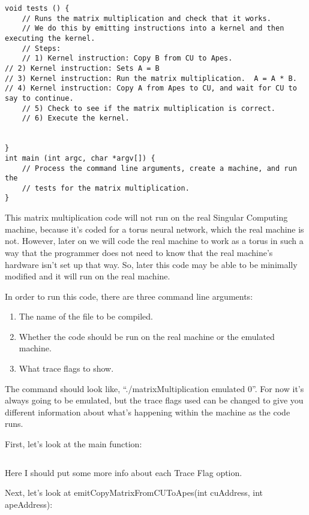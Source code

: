 \documentclass[10pt]{article}
\begin{document}
\begin{verbatim}
void tests () {
    // Runs the matrix multiplication and check that it works.
    // We do this by emitting instructions into a kernel and then executing the kernel.
    // Steps:
    // 1) Kernel instruction: Copy B from CU to Apes.
// 2) Kernel instruction: Sets A = B
// 3) Kernel instruction: Run the matrix multiplication.  A = A * B.
// 4) Kernel instruction: Copy A from Apes to CU, and wait for CU to say to continue.
    // 5) Check to see if the matrix multiplication is correct.
    // 6) Execute the kernel.


}
int main (int argc, char *argv[]) {
    // Process the command line arguments, create a machine, and run the
    // tests for the matrix multiplication.
}
\end{verbatim}

This matrix multiplication code will not run on the real Singular Computing machine, because it’s coded for a torus neural network, which the real machine is not.  However, later on we will code the real machine to work as a torus in such a way that the programmer does not need to know that the real machine’s hardware isn’t set up that way.  So, later this code may be able to be minimally modified and it will run on the real machine. \par  
In order to run this code, there are three command line arguments: \par
\begin{enumerate}
\item The name of the file to be compiled.  
\item Whether the code should be run on the real machine or the emulated machine. \item What trace flags to show.
\end{enumerate}
The command should look like, “./matrixMultiplication emulated 0”.  For now it’s always going to be emulated, but the trace flags used can be changed to give you different information about what’s happening within the machine as the code runs. \par
    First, let’s look at the main function:

\inputminted{c}{mm-main.c}

Here I should put some more info about each Trace Flag option. \par

Next, let’s look at emitCopyMatrixFromCUToApes(int cuAddress, int apeAddress):

\inputminted{c}{mm-emitCopyMatrixFromCUToApes.c}
\end{document}
